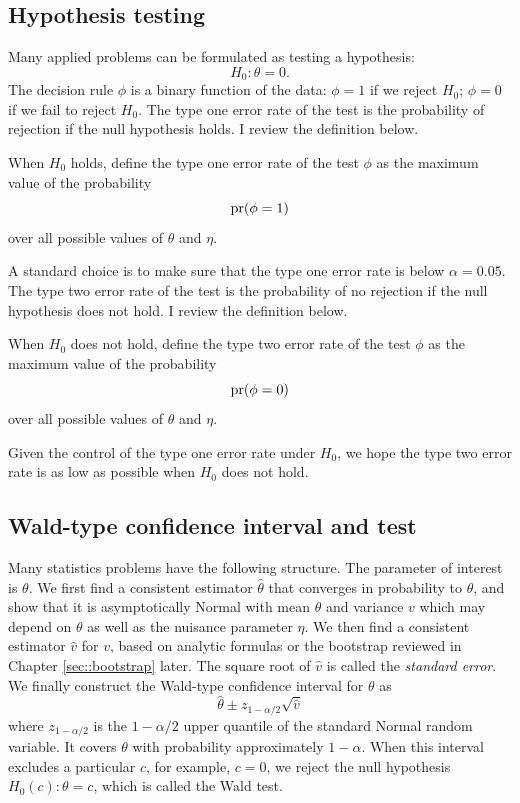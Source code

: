 \subsection{Hypothesis testing}


  Many applied problems can be formulated as testing a hypothesis:
  $$
  H_0: \theta = 0 .
  $$
The decision rule $\phi$ is a binary function of the data: $\phi = 1$ if we reject $H_0$; $\phi = 0$ if we fail to reject   $H_0$. The type one error rate of the test is the probability of rejection if the null hypothesis holds. I review the definition below. 


\begin{definition}
\label{def::size-test}
When $H_0$ holds, define the type one error rate of the test $\phi$ as the maximum value of the probability
$$
\textup{pr}(\phi = 1)
$$
over all possible values of $\theta$ and $\eta$.     
\end{definition}
  

A standard choice is to make sure that the type one error rate is below $\alpha = 0.05$. The type two error rate of the test is the probability of no rejection if the null hypothesis does not hold. I review the definition below. 


\begin{definition}
\label{def::type2-error-test}
When $H_0$ does not hold, define the type two error rate of the test $\phi$ as the maximum value of the  probability
$$
\textup{pr}(\phi = 0)
$$
over all possible values of $\theta$ and $\eta$.     
\end{definition}


Given the control of the type one error rate under $H_0$, we hope the type two error rate is as low as possible when $H_0$ does not hold. 






\subsection{Wald-type confidence interval and test}\label{section::wald-type-ci-test}


Many statistics problems have the following structure. The parameter of interest is $\theta$. We first find a consistent estimator $\hat\theta$ that converges in probability to $\theta$, and show that it is asymptotically Normal with mean $\theta$ and variance $v$ which may depend on $\theta$ as well as the nuisance parameter $\eta$. We then find a consistent estimator $\hat v$ for $v$, based on analytic formulas or the bootstrap reviewed in Chapter \ref{sec::bootstrap} later. 
The square root of $\hat v$ is called the {\it standard error}. 
We finally construct the Wald-type confidence interval for $\theta$ as
$$
\hat{\theta} \pm z_{1-\alpha/2} \sqrt{ \hat{v} }
$$  
where $z_{1-\alpha/2}$ is the $1-\alpha/2$ upper quantile of the standard Normal random variable.
It covers $\theta$ with probability approximately $1-\alpha$. When this interval excludes a particular $c$, for example, $c = 0$, we reject the null hypothesis $H_0(c): \theta = c$, which is called the Wald test. 

